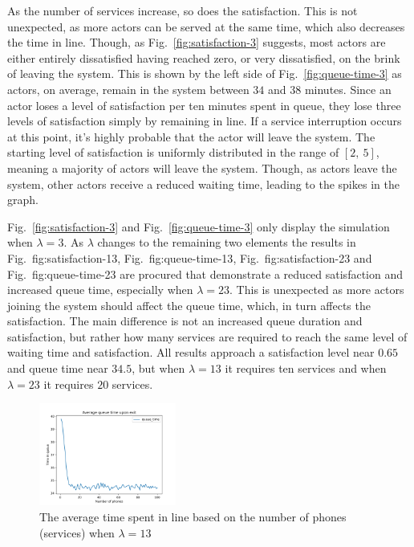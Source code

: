 \documentclass[conference]{IEEEtran}
\begin{document}
As the number of services increase, so does the satisfaction. This
is not unexpected, as more actors can be served at the same time,
which also decreases the time in line. Though, as
Fig.~\ref{fig:satisfaction-3} suggests, most actors are
either entirely dissatisfied having reached zero, or very
dissatisfied, on the brink of leaving the system. This is shown by
the left side of Fig.~\ref{fig:queue-time-3} as actors, on average,
remain in the system between $34$ and $38$ minutes. Since an actor
loses a level of satisfaction per ten minutes spent in queue, they
lose three levels of satisfaction simply by remaining in line. If a
service interruption occurs at this point, it's highly probable
that the actor will leave the system. The starting level of
satisfaction is uniformly distributed in the range of $[2,~5]$,
meaning a majority of actors will leave the system. Though, as
actors leave the system, other actors receive a reduced waiting
time, leading to the spikes in the graph.

Fig.~\ref{fig:satisfaction-3} and Fig.~\ref{fig:queue-time-3} only
display the simulation when $\lambda = 3$. As $\lambda$ changes to
the remaining two elements the results in
Fig.~{fig:satisfaction-13}, Fig.~{fig:queue-time-13},
Fig.~{fig:satisfaction-23} and Fig.~{fig:queue-time-23} are
procured that demonstrate a reduced satisfaction and increased
queue time, especially when $\lambda = 23$. This is unexpected as
more actors joining the system should affect the queue time, which,
in turn affects the satisfaction. The main difference is not an
increased queue duration and satisfaction, but rather how many
services are required to reach the same level of waiting time and
satisfaction. All results approach a satisfaction level near $0.65$
and queue time near $34.5$, but when $\lambda = 13$ it requires
ten services and when $\lambda = 23$ it requires $20$ services.

\begin{figure}[htbp]
    \centerline{
        \includegraphics[width=0.4\textwidth]{
            figures/queue-time-13.png
        }
    }
    \caption{
        The average time spent in line based on the number of
        phones (services) when $\lambda = 13$
    }
    \label{fig:queue-time-13}
\end{figure}
\end{document}
